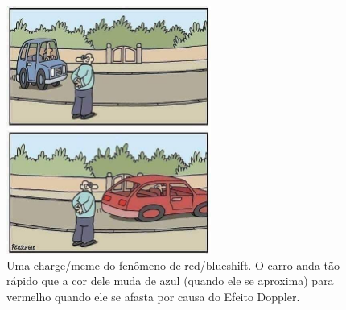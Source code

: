 \documentclass[12pt]{extarticle}
\newcommand{\<}{\langle}
\renewcommand{\>}{\rangle}
\theoremstyle{definition}
\begin{document}
\begin{figure}[H]
    \centering
    \includegraphics[width=0.6\textwidth]{red_blueshift_meme.jpg}
    \caption{Uma charge/meme do fenômeno de red/blueshift. O carro anda tão rápido que a cor dele muda de azul (quando ele se aproxima) para vermelho quando ele se afasta por causa do Efeito Doppler.}
    \label{fig:red_blueshift_meme}
\end{figure}
\end{document}
